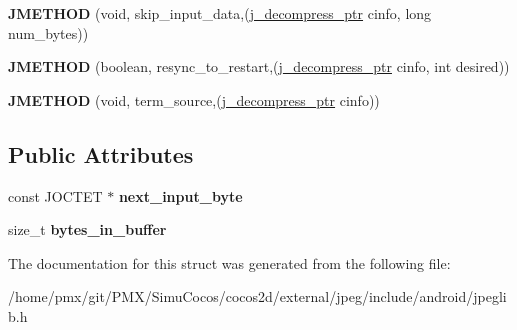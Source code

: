 \begin{DoxyCompactItemize}
\item 
\mbox{\label{structjpeg__source__mgr_a3e29df8ddadb0c15e54b69b5a7a10305}} 
{\bfseries J\+M\+E\+T\+H\+OD} (void, skip\+\_\+input\+\_\+data,(\hyperlink{structjpeg__decompress__struct}{j\+\_\+decompress\+\_\+ptr} cinfo, long num\+\_\+bytes))
\item 
\mbox{\label{structjpeg__source__mgr_a60a35ccd1fb8d954f34c0cdbf29ac010}} 
{\bfseries J\+M\+E\+T\+H\+OD} (boolean, resync\+\_\+to\+\_\+restart,(\hyperlink{structjpeg__decompress__struct}{j\+\_\+decompress\+\_\+ptr} cinfo, int desired))
\item 
\mbox{\label{structjpeg__source__mgr_a6c0683ce1166b9ee659b2d3aa1efb1c2}} 
{\bfseries J\+M\+E\+T\+H\+OD} (void, term\+\_\+source,(\hyperlink{structjpeg__decompress__struct}{j\+\_\+decompress\+\_\+ptr} cinfo))
\end{DoxyCompactItemize}
\subsection*{Public Attributes}
\begin{DoxyCompactItemize}
\item 
\mbox{\label{structjpeg__source__mgr_a55ae87eab1cd62314f215c0a33b0f018}} 
const J\+O\+C\+T\+ET $\ast$ {\bfseries next\+\_\+input\+\_\+byte}
\item 
\mbox{\label{structjpeg__source__mgr_a8ecb72557c1c9666d77fffea074282a4}} 
size\+\_\+t {\bfseries bytes\+\_\+in\+\_\+buffer}
\end{DoxyCompactItemize}


The documentation for this struct was generated from the following file\+:\begin{DoxyCompactItemize}
\item 
/home/pmx/git/\+P\+M\+X/\+Simu\+Cocos/cocos2d/external/jpeg/include/android/jpeglib.\+h\end{DoxyCompactItemize}
